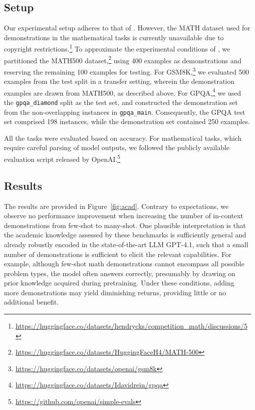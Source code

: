 \documentclass[11pt]{article}
\begin{document}
\subsection{Setup}
\label{app:setup_academic}
Our experimental setup adheres to that of \citet{agarwal2024manyshot}.
However, the MATH dataset used for demonstrations in the mathematical tasks is currently unavailable due to copyright restrictions.\footnote{\url{https://huggingface.co/datasets/hendrycks/competition_math/discussions/5}}
To approximate the experimental conditions of \citet{agarwal2024manyshot}, we partitioned the MATH500 dataset,\footnote{\url{https://huggingface.co/datasets/HuggingFaceH4/MATH-500}} using 400 examples as demonstrations and reserving the remaining 100 examples for testing.
For GSM8K,\footnote{\url{https://huggingface.co/datasets/openai/gsm8k}} we evaluated 500 examples from the test split in a transfer setting, wherein the demonstration examples are drawn from MATH500, as described above.
For GPQA,\footnote{\url{https://huggingface.co/datasets/Idavidrein/gpqa}} we used the \texttt{gpqa\_diamond} split as the test set, and constructed the demonstration set from the non-overlapping instances in \texttt{gpqa\_main}.
Consequently, the GPQA test set comprised 198 instances, while the demonstration set contained 250 examples.

All the tasks were evaluated based on accuracy.
For mathematical tasks, which require careful parsing of model outputs, we followed the publicly available evaluation script released by OpenAI.\footnote{\url{https://github.com/openai/simple-evals}}


\subsection{Results}
\label{app:results_academic}
The results are provided in Figure~\ref{fig:acad}.
Contrary to expectations, we observe no performance improvement when increasing the number of in-context demonstrations from few-shot to many-shot.
One plausible interpretation is that the academic knowledge assessed by these benchmarks is sufficiently general and already robustly encoded in the state-of-the-art LLM GPT-4.1, such that a small number of demonstrations is sufficient to elicit the relevant capabilities.
For example, although few-shot math demonstrations cannot encompass all possible problem types, the model often answers correctly, presumably by drawing on prior knowledge acquired during pretraining.
Under these conditions, adding more demonstrations may yield diminishing returns, providing little or no additional benefit.
\end{document}
